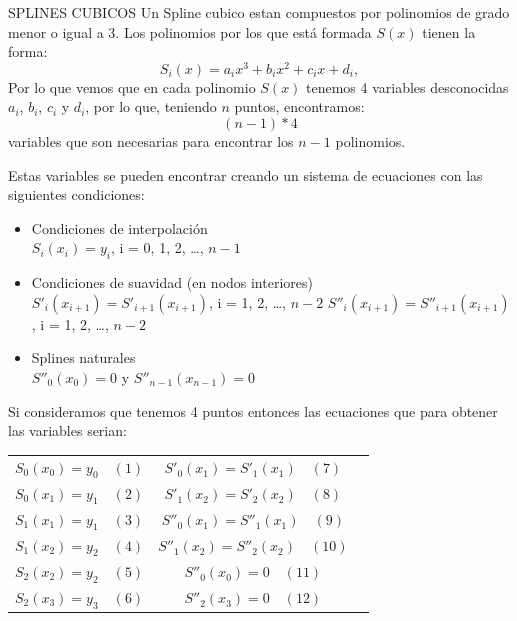 \documentclass[11pt]{beamer}
\begin{document}
		\begin{frame}{SPLINES CUBICOS}
			Un Spline cubico estan compuestos por polinomios de grado menor o igual a 3.
			Los polinomios por los que está formada $ S(x) $ tienen la forma:
			$$ S_i(x) = a_ix^3 + b_ix^2 + c_ix + d_i, $$
			Por lo que vemos que en cada polinomio $ S(x) $ tenemos 4 variables desconocidas $a_i$, $b_i$, $c_i$ y $d_i$, por lo que, teniendo $n$ puntos, encontramos:
			$$ (n-1)*4 $$ 
			variables que son necesarias para encontrar los $ n-1 $ polinomios.
		\end{frame}

		\begin{frame}
			Estas variables se pueden encontrar creando un sistema de ecuaciones con las siguientes condiciones:
			\begin{itemize}
				\item Condiciones de interpolación \\
					 $ S_i(x_i) = y_i $, i = 0, 1, 2, …, $n-1$
				\item Condiciones de suavidad (en nodos interiores)\\
					 $ S'_i(x_{i+1}) = S'_{i+1}(x_{i+1}) $, i = 1, 2, …, $n-2$
					 $ S''_i(x_{i+1}) = S''_{i+1}(x_{i+1}) $, i = 1, 2, …, $n-2$ 
				\item Splines naturales\\
					 $ S''_0(x_0) = 0 $ y $ S''_{n-1}(x_{n-1}) = 0 $
			\end{itemize}
		\end{frame}

		\begin{frame}
			Si consideramos que tenemos 4 puntos entonces las ecuaciones que para obtener las variables serian:\\
			\begin{table}[h!]
				\centering
				\begin{tabular}{c    c	 c}
					$ S_0(x_0) = y_0 \quad (1) $ & $ S'_0(x_1) = S'_1(x_1) \quad (7) $ \\
					$ S_0(x_1) = y_1 \quad (2) $ & $ S'_1(x_2) = S'_2(x_2) \quad (8) $ \\
					$ S_1(x_1) = y_1 \quad (3) $ & $ S''_0(x_1) = S''_1(x_1) \quad (9) $ \\
					$ S_1(x_2) = y_2 \quad (4) $ & $ S''_1(x_2) = S''_2(x_2) \quad (10) $ \\	
					$ S_2(x_2) = y_2 \quad (5) $ & $ S''_0(x_0) = 0 \quad (11) $ \\
					$ S_2(x_3) = y_3 \quad (6) $ & $ S''_2(x_3) = 0 \quad (12) $ \\
				\end{tabular}
			\end{table}
		\end{frame}
\end{document}
